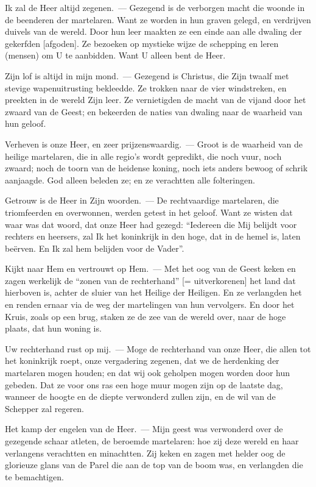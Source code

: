 \documentclass[12pt,twoside,a5paper]{article}
\begin{document}

\begin{halfparskip}
  Ik zal de Heer altijd zegenen.~--- Gezegend is de verborgen macht die woonde in de beenderen der martelaren. Want ze worden in hun graven gelegd, en verdrijven duivels van de wereld. Door hun leer maakten ze een einde aan alle dwaling der gekerfden [afgoden]. Ze bezoeken op mystieke wijze de schepping en leren (mensen) om U te aanbidden. Want U alleen bent de Heer.

  Zijn lof is altijd in mijn mond.~--- Gezegend is Christus, die Zijn twaalf met stevige wapenuitrusting bekleedde. Ze trokken naar de vier windstreken, en preekten in de wereld Zijn leer. Ze vernietigden de macht van de vijand door het zwaard van de Geest; en bekeerden de naties van dwaling naar de waarheid van hun geloof.

  Verheven is onze Heer, en zeer prijzenswaardig.~--- Groot is de waarheid van de heilige martelaren, die in alle regio's wordt gepredikt, die noch vuur, noch zwaard; noch de toorn van de heidense koning, noch iets anders bewoog of schrik aanjaagde. God alleen beleden ze; en ze verachtten alle folteringen.

  Getrouw is de Heer in Zijn woorden.~--- De rechtvaardige martelaren, die triomfeerden en overwonnen, werden getest in het geloof. Want ze wisten dat waar was dat woord, dat onze Heer had gezegd: ``Iedereen die Mij belijdt voor rechters en heersers, zal Ik het koninkrijk in den hoge, dat in de hemel is, laten beërven. En Ik zal hem belijden voor de Vader''.

  Kijkt naar Hem en vertrouwt op Hem.~--- Met het oog van de Geest keken en zagen werkelijk de ``zonen van de rechterhand'' [= uitverkorenen] het land dat hierboven is, achter de sluier van het Heilige der Heiligen. En ze verlangden het en renden ernaar via de weg der martelingen van hun vervolgers. En door het Kruis, zoals op een brug, staken ze de zee van de wereld over, naar de hoge plaats, dat hun woning is.

  Uw rechterhand rust op mij.~--- Moge de rechterhand van onze Heer, die allen tot het koninkrijk roept, onze vergadering zegenen, dat we de herdenking der martelaren mogen houden; en dat wij ook geholpen mogen worden door hun gebeden. Dat ze voor ons ras een hoge muur mogen zijn op de laatste dag, wanneer de hoogte en de diepte verwonderd zullen zijn, en de wil van de Schepper zal regeren.

  Het kamp der engelen van de Heer.~--- Mijn geest was verwonderd over de gezegende schaar atleten, de beroemde martelaren: hoe zij deze wereld en haar verlangens verachtten en minachtten. Zij keken en zagen met helder oog de glorieuze glans van de Parel die aan de top van de boom was, en verlangden die te bemachtigen.


\end{halfparskip}
\end{document}
